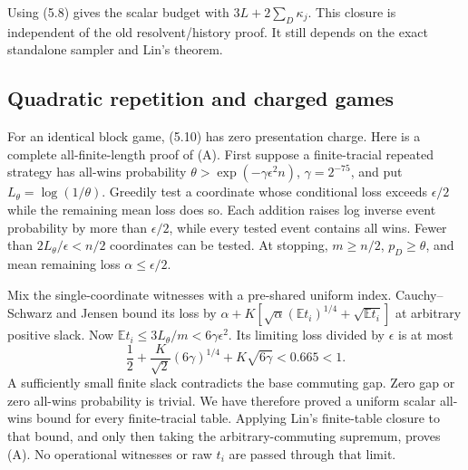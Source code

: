 \documentclass[11pt,reqno]{amsart}
\numberwithin{equation}{section}
\begin{document}
Using (5.8) gives the scalar budget with \(3L+2\sum_D\kappa_j\). This closure is independent of the old resolvent/history proof. It still depends on the exact standalone sampler and Lin's theorem.

\subsection{Quadratic repetition and charged games}\label{quadratic-repetition-and-charged-games}

For an identical block game, (5.10) has zero presentation charge. Here is a complete all-finite-length proof of (A). First suppose a finite-tracial repeated strategy has all-wins probability \(\theta>\exp(-\gamma\epsilon^2n)\), \(\gamma=2^{-75}\), and put \(L_\theta=\log(1/\theta)\). Greedily test a coordinate whose conditional loss exceeds \(\epsilon/2\) while the remaining mean loss does so. Each addition raises log inverse event probability by more than \(\epsilon/2\), while every tested event contains all wins. Fewer than \(2L_\theta/\epsilon<n/2\) coordinates can be tested. At stopping, \(m\ge n/2\), \(p_D\ge\theta\), and mean remaining loss \(\alpha\le\epsilon/2\).

Mix the single-coordinate witnesses with a pre-shared uniform index. Cauchy--Schwarz and Jensen bound its loss by \(\alpha+K[\sqrt\alpha(\mathbb Et_i)^{1/4}+\sqrt{\mathbb Et_i}]\) at arbitrary positive slack. Now \(\mathbb Et_i\le3L_\theta/m<6\gamma\epsilon^2\). Its limiting loss divided by \(\epsilon\) is at most \[
 \frac12+\frac K{\sqrt2}(6\gamma)^{1/4}
                 +K\sqrt{6\gamma}<0.665<1.
\] A sufficiently small finite slack contradicts the base commuting gap. Zero gap or zero all-wins probability is trivial. We have therefore proved a uniform scalar all-wins bound for every finite-tracial table. Applying Lin's finite-table closure to that bound, and only then taking the arbitrary-commuting supremum, proves (A). No operational witnesses or raw \(t_i\) are passed through that limit.
\end{document}
